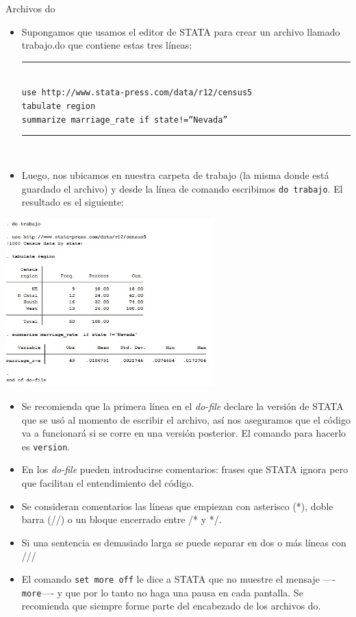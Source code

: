 \documentclass{beamer}
\begin{document}
\begin{frame}[allowframebreaks]{Archivos do}
\begin{itemize}
\item Supongamos que usamos el editor de STATA para crear un archivo llamado trabajo.do que contiene estas tres líneas:\\
\rule{11cm}{0.1pt}\\
{\footnotesize
\texttt{use http://www.stata-press.com/data/r12/census5}\\
\texttt{tabulate region}\\
\texttt{summarize marriage\_rate if state!=``Nevada''}}\\
\rule{11cm}{0.1pt}\\
\item Luego, nos ubicamos en nuestra carpeta de trabajo (la misma donde está guardado el archivo) y desde la línea de comando escribimos \texttt{do trabajo}. El resultado es el siguiente:
\end{itemize}
\centerline{\includegraphics[height=6.5cm]{fig1.jpg}}
\begin{itemize}
\item Se recomienda que la primera línea en el \textit{do-file} declare la versión de STATA que se usó al momento de escribir el archivo, así nos aseguramos que el código va a funcionará si se corre en una versión posterior. El comando para hacerlo es \texttt{version}.
\item En los \textit{do-file} pueden introducirse comentarios: frases que STATA ignora pero que facilitan el entendimiento del código.
\item Se consideran comentarios las líneas que empiezan con asterisco (*), doble barra (//) o un bloque encerrado entre /* y */.
\item Si una sentencia es demasiado larga se puede separar en dos o más líneas con /// 
\item El comando \texttt{set more off} le dice a STATA que no muestre el mensaje ----\texttt{more}---- y que por lo tanto no haga una pausa en cada pantalla. Se recomienda que siempre forme parte del encabezado de los archivos do.

\end{itemize}
\end{frame}
\end{document}
